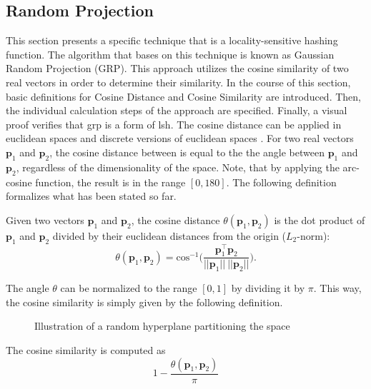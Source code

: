 \documentclass[../../../main.tex]{subfiles}
\begin{document}
\subsection{Random Projection}\label{subsec:random_projection}

This section presents a specific technique that is a locality-sensitive hashing function. The algorithm that bases on this technique is known as Gaussian Random Projection (GRP). This approach utilizes the cosine similarity of two real vectors in order to determine their similarity. In the course of this section, basic definitions for Cosine Distance and Cosine Similarity are introduced. Then, the individual calculation steps of the approach are specified. Finally, a visual proof verifies that \gls{grp} is a form of \gls{lsh}.
\newpage
The cosine distance can be applied in euclidean spaces and discrete versions of euclidean spaces \cite[95]{leskovec_rajaraman_ullman_2014}. For two real vectors $\bm{p}_1$ and $\bm{p}_2$, the cosine distance between is equal to the the angle between $\bm{p}_1$ and $\bm{p}_2$, regardless of the dimensionality of the space. Note, that by applying the arc-cosine function, the result is in the range $[0, 180]$. The following definition formalizes what has been stated so far.

\begin{definition}
    Given two vectors $\bm{p}_1$ and $\bm{p}_2$, the cosine distance $\theta(\bm{p}_1, \bm{p}_2)$ is the dot product of $\bm{p}_1$ and $\bm{p}_2$ divided by their euclidean distances from the origin ($L_2$-norm):
    \begin{equation}
        \theta(\bm{p}_1, \bm{p}_2) = \text{cos}^{-1} \bigg( \frac{\bm{p}_1^\top \bm{p}_2}{||\bm{p}_1|| \: ||\bm{p}_2||} \Bigg).
    \end{equation}
\end{definition}

The angle $\theta$ can be normalized to the range $[0, 1]$ by dividing it by $\pi$. This way, the cosine similarity is simply given by the following definition.

\begin{figure}[t!]
    \centering
    
    \caption{Illustration of a random hyperplane partitioning the space}
    \label{fig:rp_3d}
\end{figure}

\begin{definition}
    The cosine similarity is computed as
    \begin{equation}
        1- \frac{\theta(\bm{p}_1, \bm{p}_2)}{\pi}
    \end{equation}
\end{definition}
\end{document}
